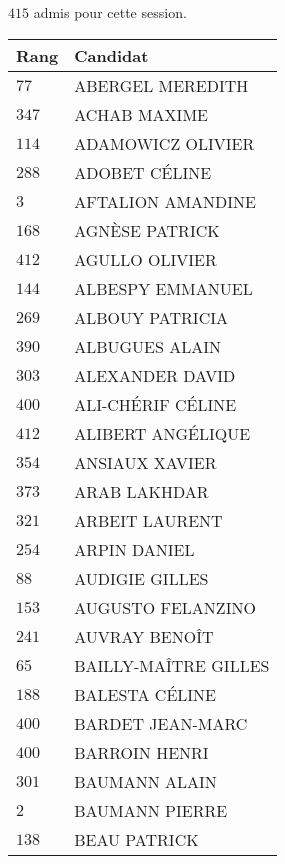 




  $415$ admis pour cette session.

  \begin{xltabular}{\linewidth}{|l|X|}
    \hline
    \textbf{Rang} & \textbf{Candidat} \\
    \hline
    $77$ & ABERGEL MEREDITH \\
    \hline
    $347$ & ACHAB MAXIME \\
    \hline
    $114$ & ADAMOWICZ OLIVIER \\
    \hline
    $288$ & ADOBET CÉLINE \\
    \hline
    $3$ & AFTALION AMANDINE \\
    \hline
    $168$ & AGNÈSE PATRICK \\
    \hline
    $412$ & AGULLO OLIVIER \\
    \hline
    $144$ & ALBESPY EMMANUEL \\
    \hline
    $269$ & ALBOUY PATRICIA \\
    \hline
    $390$ & ALBUGUES ALAIN \\
    \hline
    $303$ & ALEXANDER DAVID \\
    \hline
    $400$ & ALI-CHÉRIF CÉLINE \\
    \hline
    $412$ & ALIBERT ANGÉLIQUE \\
    \hline
    $354$ & ANSIAUX XAVIER \\
    \hline
    $373$ & ARAB LAKHDAR \\
    \hline
    $321$ & ARBEIT LAURENT \\
    \hline
    $254$ & ARPIN DANIEL \\
    \hline
    $88$ & AUDIGIE GILLES \\
    \hline
    $153$ & AUGUSTO FELANZINO \\
    \hline
    $241$ & AUVRAY BENOÎT \\
    \hline
    $65$ & BAILLY-MAÎTRE GILLES \\
    \hline
    $188$ & BALESTA CÉLINE \\
    \hline
    $400$ & BARDET JEAN-MARC \\
    \hline
    $400$ & BARROIN HENRI \\
    \hline
    $301$ & BAUMANN ALAIN \\
    \hline
    $2$ & BAUMANN PIERRE \\
    \hline
    $138$ & BEAU PATRICK \\
    \hline

\end{xltabular}

